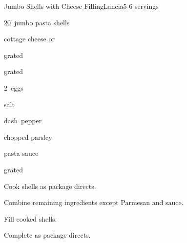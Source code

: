 \begin{recipe}{Jumbo Shells with Cheese Filling}{Lancia}{5-6 servings}

\begin{ingredients}
\item 20~jumbo pasta shells
\item {} cottage cheese or 
\item \C{1\half} grated 
\item \C{1\half} grated 
\item 2~eggs
\item \tp{\half} salt
\item dash~pepper
\item {} chopped parsley
\item \C{3\half} pasta sauce
\item \C{\quarter} grated 
\end{ingredients}

\begin{directions}
\item Cook shells as package directs.
\item Combine remaining ingredients except Parmesan and sauce.
\item Fill cooked shells.
\item Complete as package directs.
\end{directions}

\end{recipe}
